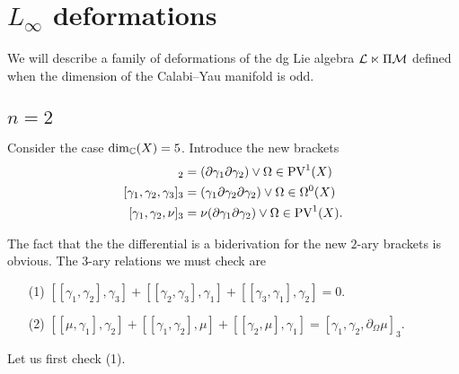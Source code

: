 \documentclass[11pt]{amsart}
\def\PV{{\rm PV}}
\begin{document}


\section{$L_\infty$ deformations}
We will describe a family of deformations of the dg Lie algebra $\mathcal L \ltimes \Pi \mathcal M$ defined when the dimension of the Calabi--Yau manifold is odd.

\subsection{$n=2$} 
Consider the case $\dim_{\mathbb C}(X) = 5$. 
Introduce the new brackets
\begin{align*}
[\gamma_1, \gamma_2]_2 &= (\partial \gamma_1 \partial \gamma_2)\vee \Omega \in \PV^1(X) \\
[\gamma_1, \gamma_2, \gamma_3]_3 & = (\gamma_1 \partial \gamma_2 \partial \gamma_2)\vee \Omega \in \Omega^0(X) \\
[\gamma_1, \gamma_2, \nu]_3 & = \nu (\partial \gamma_1 \partial \gamma_2)\vee \Omega \in \PV^1(X) .
\end{align*}

The fact that the the differential is a biderivation for the new $2$-ary brackets is obvious. 
The $3$-ary relations we must check are
\begin{itemize}
\item[(1)] $[[\gamma_1, \gamma_2] , \gamma_3] + [[\gamma_2, \gamma_3], \gamma_1] + [[\gamma_3, \gamma_1], \gamma_2] = 0 .$
\item[(2)] $[[\mu, \gamma_1], \gamma_2] + [[\gamma_1, \gamma_2], \mu] + [[\gamma_2, \mu], \gamma_1] = [\gamma_1, \gamma_2, \partial_\Omega \mu]_3$.
\end{itemize}

Let us first check (1). 
\end{document}
